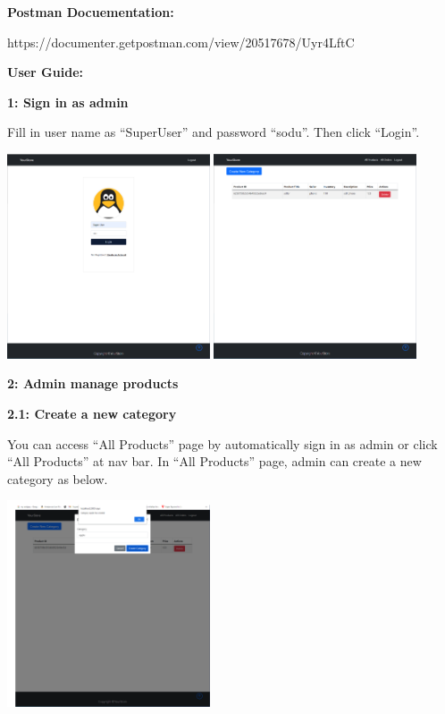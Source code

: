 \documentclass[12pt]{article}
\begin{document}
\newpage

\textbf{Postman Docuementation:}

\begin{center}
    https://documenter.getpostman.com/view/20517678/Uyr4LftC
\end{center}

\newpage 
\textbf{User Guide:}

\vspace*{5mm}
\textbf{1: Sign in as admin}

Fill in user name as “SuperUser” and password “sodu”. Then click “Login”.

\includegraphics[width=0.45\textwidth]{UserGuideImage/1.png}
\includegraphics[width=0.45\textwidth]{UserGuideImage/2.png}

\vspace*{5mm}
\textbf{2: Admin manage products}

\hspace*{5mm}\textbf{2.1: Create a new category}

You can access “All Products” page by automatically sign in as admin or click “All Products”
at nav bar. In “All Products” page, admin can create a new category as below.

\includegraphics[width=0.45\textwidth]{UserGuideImage/3.png}
\end{document}
